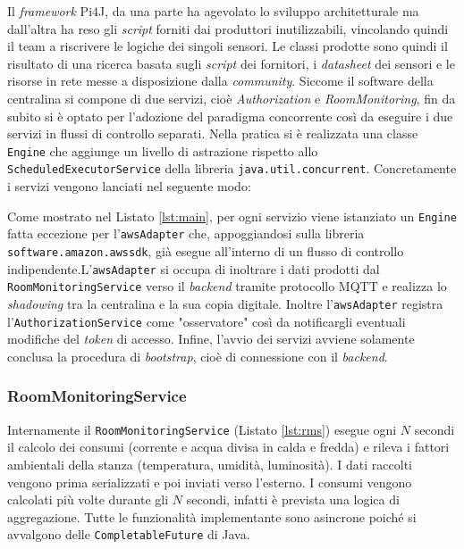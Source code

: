Il \textit{framework} Pi4J, da una parte ha agevolato lo sviluppo architetturale ma dall'altra ha reso gli \textit{script} forniti dai produttori inutilizzabili, vincolando quindi il team a riscrivere le logiche dei singoli sensori. Le classi prodotte sono quindi il risultato di una ricerca basata sugli \textit{script} dei fornitori, i \textit{datasheet} dei sensori e le risorse in rete messe a disposizione dalla \textit{community}.
\newline\newline
Siccome il software della centralina si compone di due servizi, cioè \textit{Authorization} e \textit{RoomMonitoring}, fin da subito si è optato per l'adozione del paradigma concorrente così da eseguire i due servizi in flussi di controllo separati. Nella pratica si è realizzata una classe \texttt{Engine} che aggiunge un livello di astrazione rispetto allo \texttt{ScheduledExecutorService} della libreria \texttt{java.util.concurrent}. Concretamente i servizi vengono lanciati nel seguente modo:

%
Come mostrato nel Listato \ref{lst:main}, per ogni servizio viene istanziato un \texttt{Engine} fatta eccezione per l'\texttt{awsAdapter} che, appoggiandosi sulla libreria \texttt{software.amazon.awssdk}, già esegue all'interno di un flusso di controllo indipendente.L'\texttt{awsAdapter} si occupa di inoltrare i dati prodotti dal \texttt{RoomMonitoringService} verso il \textit{backend} tramite protocollo MQTT e realizza lo \textit{shadowing} tra la centralina e la sua copia digitale. 
Inoltre l'\texttt{awsAdapter} registra l'\texttt{AuthorizationService} come "osservatore" così da notificargli eventuali modifiche del \textit{token} di accesso. Infine, l'avvio dei servizi avviene solamente conclusa la procedura di \textit{bootstrap}, cioè di connessione con il \textit{backend}.
%
\subsubsection{RoomMonitoringService}
Internamente il \texttt{RoomMonitoringService} (Listato \ref*{lst:rms}) esegue ogni $N$ secondi il calcolo dei consumi (corrente e acqua divisa in calda e fredda) e rileva i fattori ambientali della stanza (temperatura, umidità, luminosità). I dati raccolti vengono prima serializzati e poi inviati verso l'esterno. I consumi vengono calcolati più volte durante gli $N$ secondi, infatti è prevista una logica di aggregazione. Tutte le funzionalità implementante sono asincrone poiché si avvalgono delle \texttt{CompletableFuture} di Java.

%
